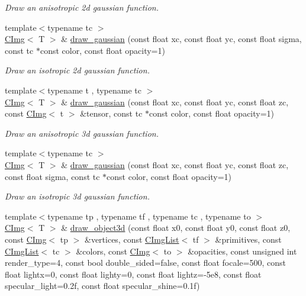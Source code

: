 \begin{DoxyCompactItemize}
\begin{DoxyCompactList}\small\item\em Draw an anisotropic 2d gaussian function. \item\end{DoxyCompactList}\item 
{\footnotesize template$<$typename tc $>$ }\\\hyperlink{structcimg__library_1_1CImg}{CImg}$<$ T $>$ \& \hyperlink{structcimg__library_1_1CImg_a5176ca43ce93eeaa158f8e3456606752}{draw\_\-gaussian} (const float xc, const float yc, const float sigma, const tc $\ast$const color, const float opacity=1)
\begin{DoxyCompactList}\small\item\em Draw an isotropic 2d gaussian function. \item\end{DoxyCompactList}\item 
{\footnotesize template$<$typename t , typename tc $>$ }\\\hyperlink{structcimg__library_1_1CImg}{CImg}$<$ T $>$ \& \hyperlink{structcimg__library_1_1CImg_a1433a5536718d44e9b42462bdca5fc06}{draw\_\-gaussian} (const float xc, const float yc, const float zc, const \hyperlink{structcimg__library_1_1CImg}{CImg}$<$ t $>$ \&tensor, const tc $\ast$const color, const float opacity=1)
\begin{DoxyCompactList}\small\item\em Draw an anisotropic 3d gaussian function. \item\end{DoxyCompactList}\item 
{\footnotesize template$<$typename tc $>$ }\\\hyperlink{structcimg__library_1_1CImg}{CImg}$<$ T $>$ \& \hyperlink{structcimg__library_1_1CImg_a7a9367d3e05ac8cda34fae2d639c42a6}{draw\_\-gaussian} (const float xc, const float yc, const float zc, const float sigma, const tc $\ast$const color, const float opacity=1)
\begin{DoxyCompactList}\small\item\em Draw an isotropic 3d gaussian function. \item\end{DoxyCompactList}\item 
{\footnotesize template$<$typename tp , typename tf , typename tc , typename to $>$ }\\\hyperlink{structcimg__library_1_1CImg}{CImg}$<$ T $>$ \& \hyperlink{structcimg__library_1_1CImg_a8fa866742ca8673e146cd8bd83b1fab1}{draw\_\-object3d} (const float x0, const float y0, const float z0, const \hyperlink{structcimg__library_1_1CImg}{CImg}$<$ tp $>$ \&vertices, const \hyperlink{structcimg__library_1_1CImgList}{CImgList}$<$ tf $>$ \&primitives, const \hyperlink{structcimg__library_1_1CImgList}{CImgList}$<$ tc $>$ \&colors, const \hyperlink{structcimg__library_1_1CImg}{CImg}$<$ to $>$ \&opacities, const unsigned int render\_\-type=4, const bool double\_\-sided=false, const float focale=500, const float lightx=0, const float lighty=0, const float lightz=-\/5e8, const float specular\_\-light=0.2f, const float specular\_\-shine=0.1f)

\end{DoxyCompactItemize}
